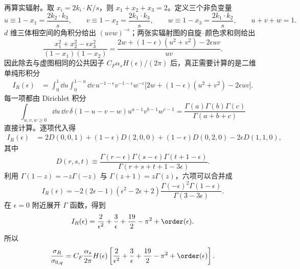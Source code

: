 \begin{derivation}[强子产生率中的实虚抵消]
再算实辐射。取 $x_i=2k_i\!\cdot K/s$，则 $x_1+x_2+x_3=2$。定义三个非负变量
\begin{equation*}
 u\equiv1-x_1=\frac{2k_2\!\cdot k_3}{s},\qquad
 v\equiv1-x_2=\frac{2k_1\!\cdot k_3}{s},\qquad
 w\equiv1-x_3=\frac{2k_1\!\cdot k_2}{s},
 \qquad u+v+w=1.
\end{equation*}
$d$ 维三体相空间的角积分给出 $(uvw)^{-\epsilon}$；两张实辐射图的自旋--颜色求和则给出
\begin{equation*}
 \frac{x_1^2+x_2^2-\epsilon x_3^2}{(1-x_1)(1-x_2)}
 =\frac{2w+(1-\epsilon)(u^2+v^2)-2\epsilon uv}{uv}.
\end{equation*}
因此除去与虚图相同的公共因子 $C_F\alpha_sH(\epsilon)/(2\pi)$ 后，真正需要计算的是二维单纯形积分
\begin{align*}
 I_R(\epsilon)
 &=\int_0^1\dd u\int_0^{1-u}\dd v\,
 u^{-1-\epsilon}v^{-1-\epsilon}w^{-\epsilon}
 \bigl[2w+(1-\epsilon)(u^2+v^2)-2\epsilon uv\bigr].
\end{align*}
每一项都由 Dirichlet 积分
\begin{equation*}
 \int_{u,v,w\ge0}\dd u\,\dd v\,
 \delta(1-u-v-w)u^{a-1}v^{b-1}w^{c-1}
 =\frac{\Gamma(a)\Gamma(b)\Gamma(c)}{\Gamma(a+b+c)}
\end{equation*}
直接计算。逐项代入得
\begin{align*}
 I_R(\epsilon)
 &=2D(0,0,1)+(1-\epsilon)D(2,0,0)
 +(1-\epsilon)D(0,2,0)-2\epsilon D(1,1,0),
\end{align*}
其中
\begin{equation*}
 D(r,s,t)
 \equiv
 \frac{\Gamma(r-\epsilon)\Gamma(s-\epsilon)\Gamma(t+1-\epsilon)}
 {\Gamma(r+s+t+1-3\epsilon)}.
\end{equation*}
利用 $\Gamma(1-z)=-z\Gamma(-z)$ 与 $\Gamma(z+1)=z\Gamma(z)$，六项可以合并成
\begin{equation*}
 I_R(\epsilon)
 =-2(2\epsilon-1)(\epsilon^2-2\epsilon+2)
 \frac{\Gamma(-\epsilon)^2\Gamma(1-\epsilon)}
 {\Gamma(3-3\epsilon)}.
\end{equation*}
在 $\epsilon=0$ 附近展开 $\Gamma$ 函数，得到
\begin{equation*}
 I_R(\epsilon)
 =\frac2{\epsilon^2}+\frac3\epsilon
 +\frac{19}{2}-\pi^2+\order(\epsilon).
\end{equation*}
所以
\begin{equation*}
 \frac{\sigma_R}{\sigma_{0,q}}
 =C_F\frac{\alpha_s}{2\pi}H(\epsilon)
 \left[\frac2{\epsilon^2}+\frac3\epsilon
 +\frac{19}{2}-\pi^2+\order(\epsilon)\right].
\end{equation*}


\end{derivation}
